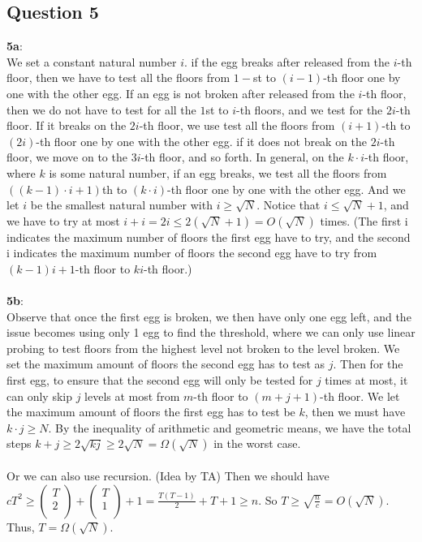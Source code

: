 \documentclass[12pt]{article}
\begin{document}
\subsection*{Question 5}
\textbf{5a}:\\
We set a constant natural number $i$. if the egg breaks after released from the $i$-th floor, then we have to test all the floors from $1-$st to $(i-1)$-th floor one by one with the other egg. If an egg is not broken after released from the $i$-th floor, then we do not have to test for all the $1$st to $i$-th floors, and we test for the $2i$-th floor. If it breaks on the $2i$-th floor, we use test all the floors from $(i+1)$-th to $(2i)$-th floor one by one with the other egg. if it does not break on the $2i$-th floor, we move on to the $3i$-th floor, and so forth. In general, on the $k\cdot i$-th floor, where $k$ is some natural number, if an egg breaks, we test all the floors from $((k-1)\cdot i + 1)$th to $(k\cdot i)$-th floor one by one with the other egg. And we let $i$ be the smallest natural number with $i \geq \sqrt{N}$. Notice that $i \leq \sqrt{N} + 1$, and we have to try at most $i + i = 2i \leq 2(\sqrt{N} + 1) = O(\sqrt{N})$ times. (The first i indicates the maximum number of floors the first egg have to try, and the second i indicates the maximum number of floors the second egg have to try from $(k-1)i + 1$-th floor to $ki$-th floor.)\\
\\
\textbf{5b}:\\
Observe that once the first egg is broken, we then have only one egg left, and the issue becomes using only 1 egg to find the threshold, where we can only use linear probing to test floors from the highest level not broken to the level broken. We set the maximum amount of floors the second egg has to test as $j$. Then for the first egg, to ensure that the second egg will only be tested for $j$ times at most, it can only skip $j$ levels at most from $m$-th floor to $(m + j + 1)$-th floor. We let the maximum amount of floors the first egg has to test be $k$, then we must have $k\cdot j \geq N$. By the inequality of arithmetic and geometric means, we have the total steps $k + j \geq 2\sqrt{kj} \geq 2\sqrt{N} = \Omega(\sqrt{N})$ in the worst case.\\
\\
Or we can also use recursion. (Idea by TA) Then we should have $cT^2 \geq  \begin{pmatrix} T \\ 2 \\ \end{pmatrix} +\begin{pmatrix} T \\ 1 \\ \end{pmatrix} + 1 = \frac{T(T-1)}{2} + T + 1 \geq n$. So $T \geq \sqrt{\frac{n}{c}} = O(\sqrt{N})$. Thus, $T = \Omega(\sqrt{N})$.\\
\end{document}
